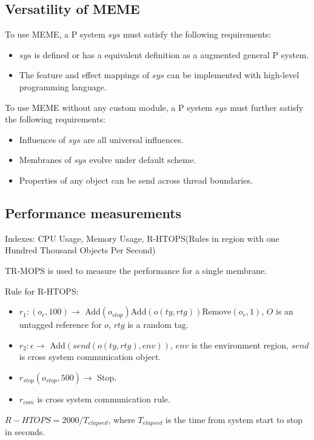 \documentclass[9pt,a4paper,twoside]{article}
\begin{document}
    \subsection{Versatility of MEME}
    To use MEME, a P system $sys$ must satisfy the following requirements:
    \begin{itemize}
        \item $sys$ is defined or has a equivalent definition as a augmented general P system.
        \item The feature and effect mappings of $sys$ can be implemented with high-level programming language.
    \end{itemize}

    To use MEME without any custom module, a P system $sys$ must further satisfy the following requirements:
     \begin{itemize}
        \item Influences of $sys$ are all universal influences.
        \item Membranes of $sys$ evolve under default scheme.
        \item Properties of any object can be send across thread boundaries.
    \end{itemize}

    \subsection{Performance measurements}
    
    Indexes: CPU Usage, Memory Usage, R-HTOPS(Rules in region with one Hundred Thousand Objects Per Second)

    TR-MOPS is used to measure the performance for a single membrane.

    Rule for R-HTOPS: 
    \begin{itemize}
        \item $r_1: (o_r, 100) \rightarrow$ Add$(o_{stop})$Add$(o(ty, rtg))$Remove$(o_r, 1)$, $O$ is an untagged reference for $o$, $rtg$ is a random tag.
        \item $r_2: \epsilon \rightarrow$ Add$(send(o(ty, rtg), env))$, $env$ is the environment region, $send$ is cross system communication object.
        \item $r_{stop} (o_{stop}, 500) \rightarrow$ Stop. 
        \item $r_{com}$ is cross system communication rule.
    \end{itemize}

    $R-HTOPS = 2000 / T_{elapsed}$, where $T_{elapsed}$ is the time from system start to stop in seconds.
\end{document}
